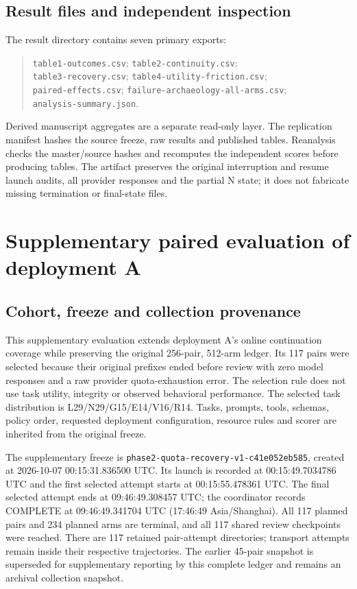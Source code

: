 \documentclass[11pt,a4paper]{article}
\newcommand{\code}[1]{\nolinkurl{#1}}
\begin{document}
\subsection{Result files and independent inspection}
The result directory contains seven primary exports:
\begin{quote}\small
\code{table1-outcomes.csv}; \code{table2-continuity.csv};\\
\code{table3-recovery.csv}; \code{table4-utility-friction.csv};\\
\code{paired-effects.csv}; \code{failure-archaeology-all-arms.csv};\\
\code{analysis-summary.json}.
\end{quote}
Derived manuscript aggregates are a separate read-only layer. The replication manifest hashes the source freeze, raw results and published tables. Reanalysis checks the master/source hashes and recomputes the independent scores before producing tables. The artifact preserves the original interruption and resume launch audits, all provider responses and the partial N state; it does not fabricate missing termination or final-state files.

\section{Supplementary paired evaluation of deployment A}
\label{app:quota-recovery}
\subsection{Cohort, freeze and collection provenance}
This supplementary evaluation extends deployment A's online continuation coverage while preserving the original 256-pair, 512-arm ledger. Its 117 pairs were selected because their original prefixes ended before review with zero model responses and a raw provider quota-exhaustion error. The selection rule does not use task utility, integrity or observed behavioral performance. The selected task distribution is L29/N29/G15/E14/V16/R14. Tasks, prompts, tools, schemas, policy order, requested deployment configuration, resource rules and scorer are inherited from the original freeze.

The supplementary freeze is \code{phase2-quota-recovery-v1-c41e052eb585}, created at 2026-10-07 00:15:31.836500 UTC. Its launch is recorded at 00:15:49.7034786 UTC and the first selected attempt starts at 00:15:55.478361 UTC. The final selected attempt ends at 09:46:49.308457 UTC; the coordinator records COMPLETE at 09:46:49.341704 UTC (17:46:49 Asia/Shanghai). All 117 planned pairs and 234 planned arms are terminal, and all 117 shared review checkpoints were reached. There are 117 retained pair-attempt directories; transport attempts remain inside their respective trajectories. The earlier 45-pair snapshot is superseded for supplementary reporting by this complete ledger and remains an archival collection snapshot.
\end{document}

